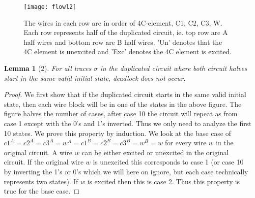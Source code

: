 \documentclass{article}
\newtheorem*{lemma}{Lemma}
\begin{document}
\begin{figure}
  \centering
    \texttt{[image: flowl2]}
  \caption{The wires in each row are in order of 4C-element, C1, C2, C3, W.  Each row represents half of the duplicated circuit, ie. top row are A half wires and bottom row are B half wires.  'Un' denotes that the 4C element is unexcited and 'Exc' denotes the 4C element is excited.  }
\end{figure}

\begin{lemma}[2]
For all traces $\sigma$ in the duplicated circuit where both circuit halves start in the same valid initial state, deadlock does not occur.
\end{lemma}
\begin{proof}
We first show that if the duplicated circuit starts in the same valid initial state, then each wire block will be in one of the states in the above figure.  The figure halves the number of cases, after case 10 the circuit will repeat as from case 1 except with the 0's and 1's inverted.  Thus we only need to analyze the first 10 states.  \newline
We prove this property by induction.  We look at the base case of $c1^A=c2^A=c3^A=w^A=c1^B=c2^B=c3^B=w^B=w$ for every wire $w$ in the original circuit.  A wire $w$ can be either excited or unexcited in the original circuit. If the original wire $w$ is unexcited this corresponds to case 1 (or case 10 by inverting the 1's or 0's which we will here on ignore, but each case technically represents two states).  If $w$ is excited then this is case 2.  Thus this property is true for the base case. \newline


\end{proof}
\end{document}
